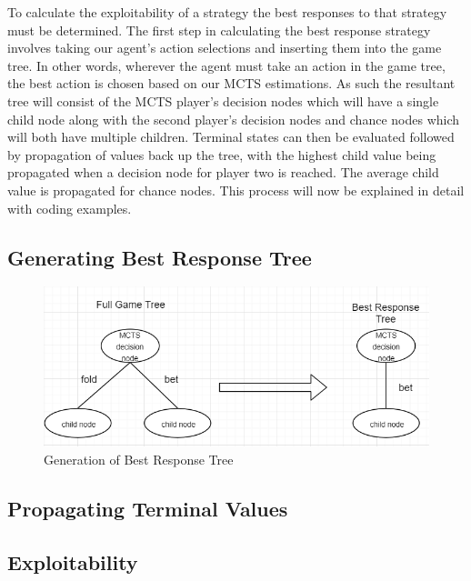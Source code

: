 To calculate the exploitability of a strategy the best responses to that strategy must be
determined.
The first step in calculating the best response strategy involves
taking our agent's action selections and inserting them into the game tree\citep{heinrich2017reinforcement}.
In other words, wherever the agent must take an action in the game tree, the best action is chosen
based on our MCTS estimations.
As such the resultant tree will consist of the MCTS player's decision nodes which will have
a single child node along with the second player's decision nodes and chance nodes
which will both have multiple children.
Terminal states can then be evaluated followed by propagation of values back up the tree, with the highest
child value being propagated when a decision node for player two is reached.
The average child value is propagated for chance nodes.
This process will now be explained in detail with coding examples.

\subsection{Generating Best Response Tree}\label{subsec:applyMCTS}

\begin{figure}[ht]
    \includegraphics[scale=1]{images/best_response_tree_vs_full_tree.PNG}
    \caption{Generation of Best Response Tree}
\end{figure}

\subsection{Propagating Terminal Values}\label{subsec:propagateTerminals}
\subsection{Exploitability}\label{subsec:exploitability}

